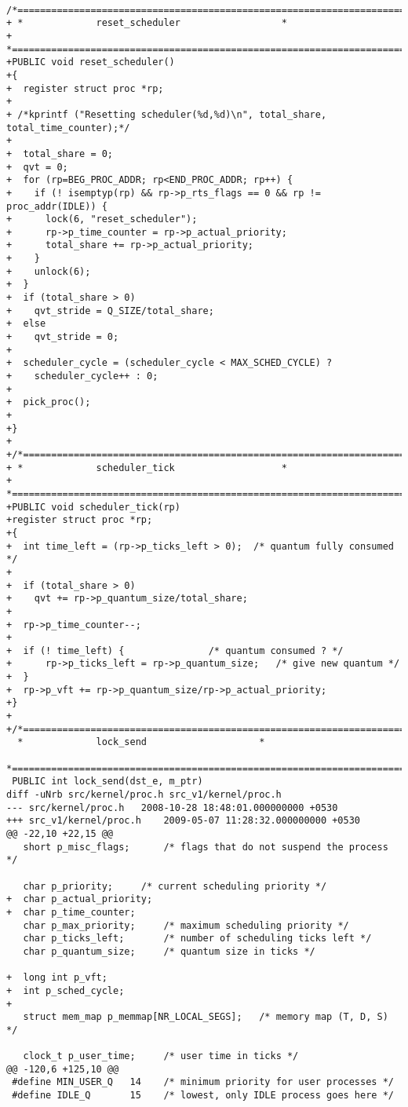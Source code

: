 \begin{verbatim}
 /*===========================================================================*
+ *				reset_scheduler				     *
+ *===========================================================================*/
+PUBLIC void reset_scheduler()
+{
+  register struct proc *rp;
+
+ /*kprintf ("Resetting scheduler(%d,%d)\n", total_share, total_time_counter);*/
+
+  total_share = 0;
+  qvt = 0;
+  for (rp=BEG_PROC_ADDR; rp<END_PROC_ADDR; rp++) {
+    if (! isemptyp(rp) && rp->p_rts_flags == 0 && rp != proc_addr(IDLE)) {
+      lock(6, "reset_scheduler");
+      rp->p_time_counter = rp->p_actual_priority;
+      total_share += rp->p_actual_priority;
+    }
+    unlock(6);
+  }
+  if (total_share > 0)
+    qvt_stride = Q_SIZE/total_share;
+  else
+    qvt_stride = 0;
+
+  scheduler_cycle = (scheduler_cycle < MAX_SCHED_CYCLE) ? 
+    scheduler_cycle++ : 0;
+
+  pick_proc();
+
+}
+
+/*===========================================================================*
+ *				scheduler_tick				     *
+ *===========================================================================*/
+PUBLIC void scheduler_tick(rp)
+register struct proc *rp;
+{
+  int time_left = (rp->p_ticks_left > 0);	/* quantum fully consumed */
+
+  if (total_share > 0)
+    qvt += rp->p_quantum_size/total_share;
+
+  rp->p_time_counter--;
+
+  if (! time_left) {				/* quantum consumed ? */
+      rp->p_ticks_left = rp->p_quantum_size; 	/* give new quantum */
+  }
+  rp->p_vft += rp->p_quantum_size/rp->p_actual_priority;
+}
+
+/*===========================================================================*
  *				lock_send				     *
  *===========================================================================*/
 PUBLIC int lock_send(dst_e, m_ptr)
diff -uNrb src/kernel/proc.h src_v1/kernel/proc.h
--- src/kernel/proc.h	2008-10-28 18:48:01.000000000 +0530
+++ src_v1/kernel/proc.h	2009-05-07 11:28:32.000000000 +0530
@@ -22,10 +22,15 @@
   short p_misc_flags;		/* flags that do not suspend the process */
 
   char p_priority;		/* current scheduling priority */
+  char p_actual_priority;
+  char p_time_counter;
   char p_max_priority;		/* maximum scheduling priority */
   char p_ticks_left;		/* number of scheduling ticks left */
   char p_quantum_size;		/* quantum size in ticks */
 
+  long int p_vft;
+  int p_sched_cycle;
+
   struct mem_map p_memmap[NR_LOCAL_SEGS];   /* memory map (T, D, S) */
 
   clock_t p_user_time;		/* user time in ticks */
@@ -120,6 +125,10 @@
 #define MIN_USER_Q	  14	/* minimum priority for user processes */
 #define IDLE_Q		  15    /* lowest, only IDLE process goes here */
 

\end{verbatim}
